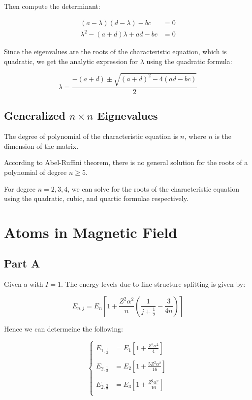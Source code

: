 \documentclass[11pt]{article}
\begin{document}
  Then compute the determinant:

  \begin{align*}
    (a - \lambda)(d - \lambda) - bc &= 0\\
    \lambda^2 - (a + d)\lambda + ad - bc &= 0
  \end{align*}

  Since the eigenvalues are the roots of the characteristic equation, which is quadratic, we get
  the analytic expression for $\lambda$ using the quadratic formula:

  \begin{equation}
    \lambda = \frac{-(a + d) \pm \sqrt{(a + d)^2 - 4(ad - bc)}}{2}
  \end{equation}

  \subsection{Generalized $n \times n$ Eignevalues}

  The degree of polynomial of the characteristic equation is $n$, where $n$ 
  is the dimension of the matrix. 

  According to Abel-Ruffini theorem, there is no general solution for the roots of a polynomial of degree $n \geq 5$.

  For degree $n = 2, 3, 4$, we can solve for the roots of the characteristic equation using the quadratic, 
  cubic, and quartic formulae respectively.

  \section{Atoms in Magnetic Field}

  \subsection{Part A}

  Given a  with $I = 1$. The energy levels due to fine structure splitting is given by:

  \begin{equation}
    E_{n,j} = E_n [1 + \frac{Z^2 \alpha^2}{n}(\frac{1}{j+\frac{1}{2}} - \frac{3}{4n})]
  \end{equation}

  Hence we can determeine the following:

  \begin{equation}
    \begin{cases}
      \displaystyle
      E_{1,\frac{1}{2}} &= E_1 [1 + \frac{Z^2 \alpha^2}{4}] \\
      \\
      \displaystyle
      E_{2,\frac{1}{2}} &= E_2 [1 + \frac{5Z^2 \alpha^2}{16}] \\
      \\
      \displaystyle
      E_{2,\frac{3}{2}} &= E_3 [1 + \frac{Z^2 \alpha^2}{16}] \\
    \end{cases}
  \end{equation}
\end{document}

